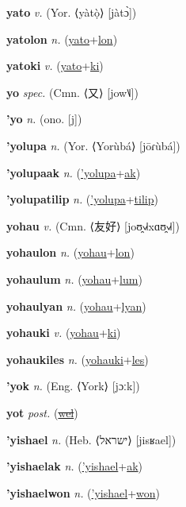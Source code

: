 \textbf{\hypertarget{yato}{yato}} \textit{v.} (Yor. ⟨yàtọ̀⟩ [jàtɔ̀])


\textbf{\hypertarget{yatolon}{yatolon}} \textit{n.} (\hyperlink{yato}{yato}+\allowbreak \hyperlink{lon}{lon})


\textbf{\hypertarget{yatoki}{yatoki}} \textit{v.} (\hyperlink{yato}{yato}+\allowbreak \hyperlink{ki}{ki})


\textbf{\hypertarget{yo}{yo}} \textit{spec.} (Cmn. ⟨{\chinese{}又}⟩ [jow˥˩])


\textbf{\hypertarget{'yo}{'yo}} \textit{n.} (ono. [j])


\textbf{\hypertarget{'yolupa}{'yolupa}} \textit{n.} (Yor. ⟨Yorùbá⟩ [jōɾùbá])


\textbf{\hypertarget{'yolupaak}{'yolupaak}} \textit{n.} (\hyperlink{'yolupa}{'yolupa}+\allowbreak \hyperlink{ak}{ak})


\textbf{\hypertarget{'yolupatilip}{'yolupatilip}} \textit{n.} (\hyperlink{'yolupa}{'yolupa}+\allowbreak \hyperlink{tilip}{tilip})


\textbf{\hypertarget{yohau}{yohau}} \textit{v.} (Cmn. ⟨{\chinese{}友好}⟩ [joʊ̯˧˩˧xɑʊ̯˧˩˧])


\textbf{\hypertarget{yohaulon}{yohaulon}} \textit{n.} (\hyperlink{yohau}{yohau}+\allowbreak \hyperlink{lon}{lon})


\textbf{\hypertarget{yohaulum}{yohaulum}} \textit{n.} (\hyperlink{yohau}{yohau}+\allowbreak \hyperlink{lum}{lum})


\textbf{\hypertarget{yohaulyan}{yohaulyan}} \textit{n.} (\hyperlink{yohau}{yohau}+\allowbreak \hyperlink{lyan}{lyan})


\textbf{\hypertarget{yohauki}{yohauki}} \textit{v.} (\hyperlink{yohau}{yohau}+\allowbreak \hyperlink{ki}{ki})


\textbf{\hypertarget{yohaukiles}{yohaukiles}} \textit{n.} (\hyperlink{yohauki}{yohauki}+\allowbreak \hyperlink{les}{les})


\textbf{\hypertarget{'yok}{'yok}} \textit{n.} (Eng. ⟨York⟩ [jɔːk])


\textbf{\hypertarget{yot}{yot}} \textit{post.} (\hyperlink{wel}{\sout{wel}})


\textbf{\hypertarget{'yishael}{'yishael}} \textit{n.} (Heb. ⟨{\hebrew{}ישראל}⟩ [jisʁael])


\textbf{\hypertarget{'yishaelak}{'yishaelak}} \textit{n.} (\hyperlink{'yishael}{'yishael}+\allowbreak \hyperlink{ak}{ak})


\textbf{\hypertarget{'yishaelwon}{'yishaelwon}} \textit{n.} (\hyperlink{'yishael}{'yishael}+\allowbreak \hyperlink{won}{won})


